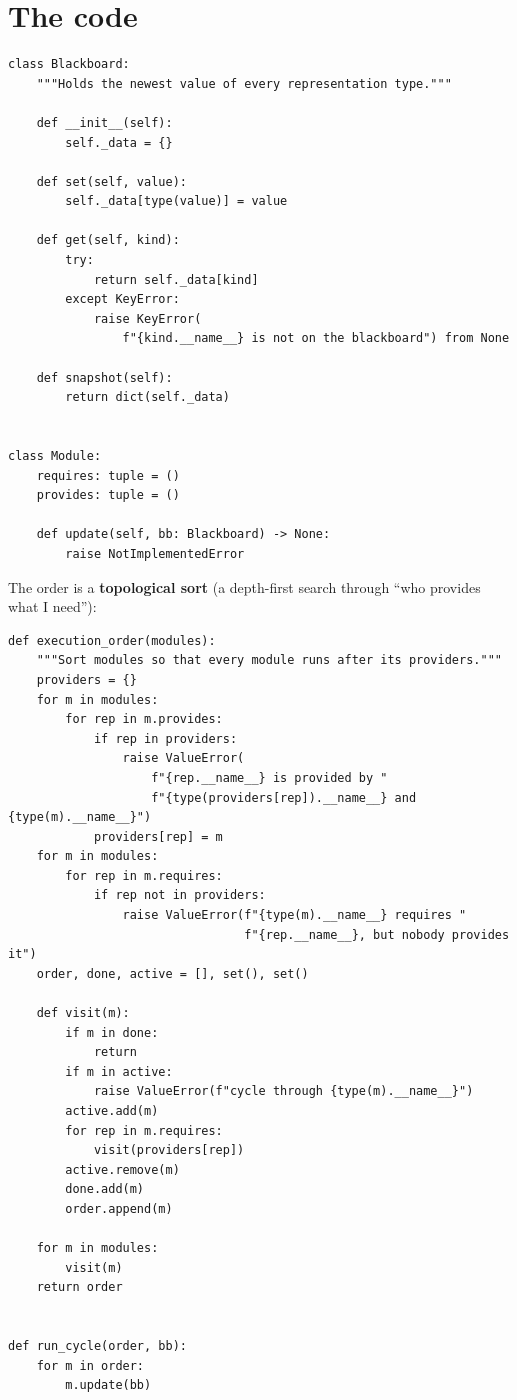 \section*{The code}
\begin{verbatim}
class Blackboard:
    """Holds the newest value of every representation type."""

    def __init__(self):
        self._data = {}

    def set(self, value):
        self._data[type(value)] = value

    def get(self, kind):
        try:
            return self._data[kind]
        except KeyError:
            raise KeyError(
                f"{kind.__name__} is not on the blackboard") from None

    def snapshot(self):
        return dict(self._data)


class Module:
    requires: tuple = ()
    provides: tuple = ()

    def update(self, bb: Blackboard) -> None:
        raise NotImplementedError
\end{verbatim}
The order is a \textbf{topological sort} (a depth-first search through ``who provides what I need''):
\begin{verbatim}
def execution_order(modules):
    """Sort modules so that every module runs after its providers."""
    providers = {}
    for m in modules:
        for rep in m.provides:
            if rep in providers:
                raise ValueError(
                    f"{rep.__name__} is provided by "
                    f"{type(providers[rep]).__name__} and {type(m).__name__}")
            providers[rep] = m
    for m in modules:
        for rep in m.requires:
            if rep not in providers:
                raise ValueError(f"{type(m).__name__} requires "
                                 f"{rep.__name__}, but nobody provides it")
    order, done, active = [], set(), set()

    def visit(m):
        if m in done:
            return
        if m in active:
            raise ValueError(f"cycle through {type(m).__name__}")
        active.add(m)
        for rep in m.requires:
            visit(providers[rep])
        active.remove(m)
        done.add(m)
        order.append(m)

    for m in modules:
        visit(m)
    return order


def run_cycle(order, bb):
    for m in order:
        m.update(bb)
\end{verbatim}


